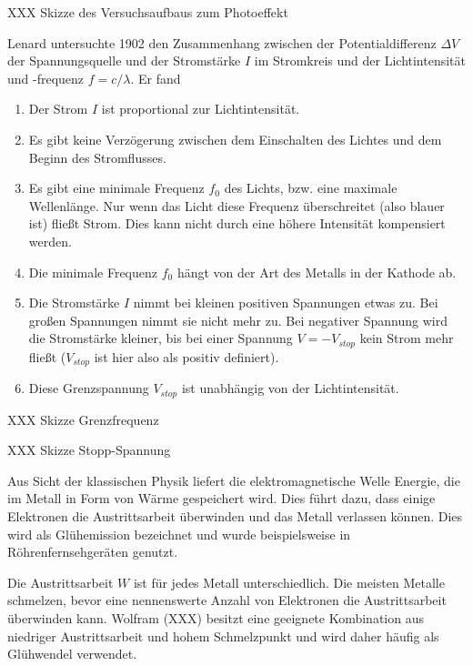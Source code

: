 \begin{marginfigure}
 \caption{XXX Skizze des Versuchsaufbaus zum Photoeffekt}
\end{marginfigure}


Lenard untersuchte 1902 den Zusammenhang zwischen der Potentialdifferenz $\Delta V$ der Spannungsquelle und der Stromstärke $I$ im Stromkreis und der Lichtintensität und -frequenz $f = c / \lambda$. Er fand
\begin{enumerate}
    \item Der Strom $I$ ist proportional zur Lichtintensität.
    \item Es gibt keine Verzögerung zwischen dem Einschalten des Lichtes und dem Beginn des Stromflusses.
    \item Es gibt eine minimale Frequenz $f_0$ des Lichts, bzw. eine maximale Wellenlänge. Nur wenn das Licht diese Frequenz überschreitet (also blauer ist) fließt Strom. Dies kann nicht durch eine höhere Intensität kompensiert werden.
    \item Die minimale Frequenz $f_0$ hängt von der Art des Metalls in der Kathode ab.
    \item Die Stromstärke $I$ nimmt bei kleinen positiven Spannungen etwas zu. Bei großen Spannungen nimmt sie nicht mehr zu. Bei negativer Spannung wird die Stromstärke kleiner, bis bei einer Spannung $V = -V_{stop}$ kein Strom mehr fließt ($V_{stop}$ ist hier also als positiv definiert). 
    \item Diese Grenzspannung $V_{stop}$ ist unabhängig von der Lichtintensität. 
\end{enumerate}

\begin{marginfigure}
    \caption{XXX Skizze Grenzfrequenz}
   \end{marginfigure}

   \begin{marginfigure}
    \caption{XXX Skizze Stopp-Spannung}
   \end{marginfigure}


Aus Sicht der klassischen Physik liefert die elektromagnetische Welle Energie, die im Metall in Form von Wärme gespeichert wird. Dies führt dazu, dass einige Elektronen die Austrittsarbeit überwinden und das Metall verlassen können. Dies wird als Glühemission bezeichnet und wurde beispielsweise in Röhrenfernsehgeräten genutzt.

Die Austrittsarbeit $W$ ist für jedes Metall unterschiedlich. Die meisten Metalle schmelzen, bevor eine nennenswerte Anzahl von Elektronen die Austrittsarbeit überwinden kann. Wolfram (XXX) besitzt eine geeignete Kombination aus niedriger Austrittsarbeit und hohem Schmelzpunkt und wird daher häufig als Glühwendel verwendet.

